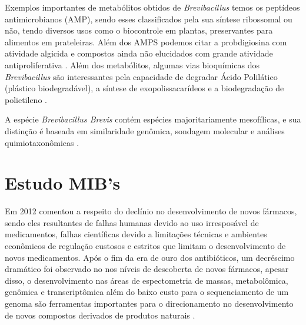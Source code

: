 Exemplos importantes de metabólitos obtidos de \textit{Brevibacillus} temos os peptídeos antimicrobianos (AMP),
sendo esses classificados pela sua síntese ribossomal ou não, tendo diversos usos como o biocontrole em plantas, preservantes
para alimentos em prateleiras\cite{yang2018antimicrobial}. Além dos AMPS podemos citar a probdigiosina com atividade algicida e compostos ainda não
elucidados com grande atividade antiproliferativa \cite{zhang2022transcriptome,arumugam2018isolation}.
Além dos metabólitos, algumas vias bioquímicas dos \textit{Brevibacillus} são interessantes pela capacidade de
degradar Ácido Polilático (plástico biodegradável), a síntese de exopolissacarídeos e a 
biodegradação de polietileno \cite{yu2022comparison,yildiz2015genomic,hadad2005biodegradation,ali2022screening}.

A espécie \textit{Brevibacillus Brevis} contém espécies majoritariamente mesofílicas, e
sua distinção é baseada em similaridade genômica, sondagem molecular e análises 
quimiotaxonômicas \cite{ray2020brevibacillus}.  

\section{Estudo MIB's}
%
Em 2012  comentou a respeito do declínio no desenvolvimento de novos
fármacos, sendo eles resultantes de falhas humanas devido ao uso irresposável de medicamentos,
falhas científicas devido a limitações técnicas e ambientes econômicos de regulação custosos e estritos
que limitam o desenvolvimento de novos medicamentos.
Após o fim da era de ouro dos antibióticos, um decréscimo dramático foi observado no nos níveis
de descoberta de novos fármacos, apesar disso, o desenvolvimento nas áreas de espectometria de massas,
metabolômica, genômica e transcriptômica além do baixo custo para o sequenciamento de um genoma são
ferramentas importantes para o direcionamento no desenvolvimento de novos compostos derivados de produtos naturais \cite{katz2016natural}. 

